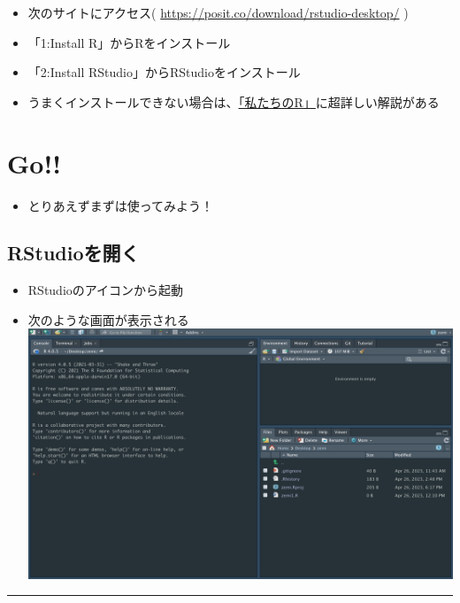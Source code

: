 \documentclass[
]{book}
\providecommand{\tightlist}{%
  \setlength{\itemsep}{0pt}\setlength{\parskip}{0pt}}
\begin{document}
\begin{itemize}
\tightlist
\item
  次のサイトにアクセス( \url{https://posit.co/download/rstudio-desktop/} )
\item
  「1:Install R」からRをインストール
\item
  「2:Install RStudio」からRStudioをインストール
\item
  うまくインストールできない場合は、\href{https://www.jaysong.net/RBook/installation.html}{「私たちのR」}に超詳しい解説がある
\end{itemize}

\hypertarget{go}{%
\chapter{Go!!}\label{go}}

\begin{itemize}
\tightlist
\item
  とりあえずまずは使ってみよう！
\end{itemize}

\hypertarget{rstudioux3092ux958bux304f}{%
\section{RStudioを開く}\label{rstudioux3092ux958bux304f}}

\begin{itemize}
\tightlist
\item
  RStudioのアイコンから起動
\item
  次のような画面が表示される\\
  \includegraphics{./img/01_rstudio_start.png}
\end{itemize}

\begin{center}\rule{0.5\linewidth}{0.5pt}\end{center}
\end{document}
